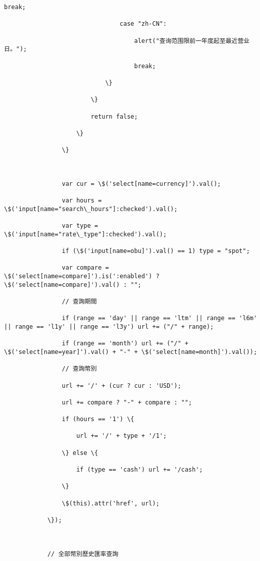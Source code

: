 \documentclass[11pt]{article}
\begin{document}
\begin{Verbatim}[commandchars=\\\{\}]
                                    break;

                                case "zh-CN":

                                    alert("查询范围限前一年度起至最近营业日。");

                                    break;

                            \}

                        \}

                        return false;

                    \}

                \}



                var cur = \$('select[name=currency]').val();

                var hours = \$('input[name="search\_hours"]:checked').val();

                var type = \$('input[name="rate\_type"]:checked').val();

                if (\$('input[name=obu]').val() == 1) type = "spot";

                var compare = \$('select[name=compare]').is(':enabled') ? \$('select[name=compare]').val() : "";

                // 查詢期間

                if (range == 'day' || range == 'ltm' || range == 'l6m' || range == 'l1y' || range == 'l3y') url += ("/" + range);

                if (range == 'month') url += ("/" + \$('select[name=year]').val() + "-" + \$('select[name=month]').val());

                // 查詢幣別

                url += '/' + (cur ? cur : 'USD');

                url += compare ? "-" + compare : "";

                if (hours == '1') \{

                    url += '/' + type + '/1';

                \} else \{

                    if (type == 'cash') url += '/cash';

                \}

                \$(this).attr('href', url);

            \});



            // 全部幣別歷史匯率查詢


\end{Verbatim}
\end{document}
